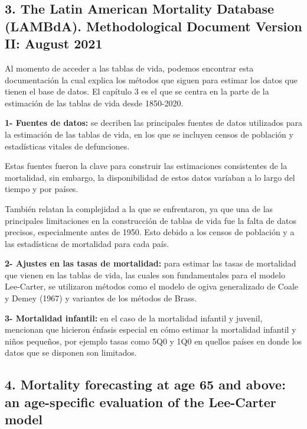\documentclass[
]{article}
\begin{document}
\hypertarget{the-latin-american-mortality-database-lambda.-methodological-document-version-ii-august-2021}{%
\subsection{3. The Latin American Mortality Database (LAMBdA).
Methodological Document Version II: August
2021}\label{the-latin-american-mortality-database-lambda.-methodological-document-version-ii-august-2021}}

Al momento de acceder a las tablas de vida, podemos encontrar esta
documentación la cual explica los métodos que siguen para estimar los
datos que tienen el base de datos. El capítulo 3 es el que se centra en
la parte de la estimación de las tablas de vida desde 1850-2020.

\textbf{1- Fuentes de datos:} se decriben las principales fuentes de
datos utilizados para la estimación de las tablas de vida, en los que se
incluyen censos de población y estadísticas vitales de defunciones.

Estas fuentes fueron la clave para construir las estimaciones
consistentes de la mortalidad, sin embargo, la disponibilidad de estos
datos varíaban a lo largo del tiempo y por países.

También relatan la complejidad a la que se enfrentaron, ya que una de
las principales limitaciones en la construcción de tablas de vida fue la
falta de datos precisos, especialmente antes de 1950. Esto debido a los
censos de población y a las estadísticas de mortalidad para cada país.

\textbf{2- Ajustes en las tasas de mortalidad:} para estimar las tasas
de mortalidad que vienen en las tablas de vida, las cuales son
fundamentales para el modelo Lee-Carter, se utilizaron métodos como el
modelo de ogiva generalizado de Coale y Demey (1967) y variantes de los
métodos de Brass.

\textbf{3- Mortalidad infantil:} en el caso de la mortalidad infantil y
juvenil, mencionan que hicieron énfasis especial en cómo estimar la
mortalidad infantil y niños pequeños, por ejemplo tasas como 5Q0 y 1Q0
en quellos países en donde los datos que se disponen son limitados.

\hypertarget{mortality-forecasting-at-age-65-and-above-an-age-specific-evaluation-of-the-lee-carter-model}{%
\subsection{4. Mortality forecasting at age 65 and above: an
age-specific evaluation of the Lee-Carter
model}\label{mortality-forecasting-at-age-65-and-above-an-age-specific-evaluation-of-the-lee-carter-model}}
\end{document}
